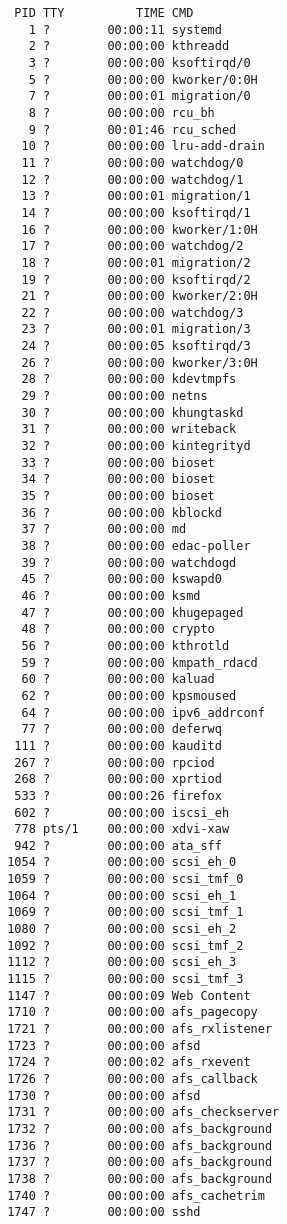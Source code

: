 \documentclass[a4paper]{article}
\begin{document}
\begin{figure}
\centering
\begin{verbatim}
  PID TTY          TIME CMD
    1 ?        00:00:11 systemd
    2 ?        00:00:00 kthreadd
    3 ?        00:00:00 ksoftirqd/0
    5 ?        00:00:00 kworker/0:0H
    7 ?        00:00:01 migration/0
    8 ?        00:00:00 rcu_bh
    9 ?        00:01:46 rcu_sched
   10 ?        00:00:00 lru-add-drain
   11 ?        00:00:00 watchdog/0
   12 ?        00:00:00 watchdog/1
   13 ?        00:00:01 migration/1
   14 ?        00:00:00 ksoftirqd/1
   16 ?        00:00:00 kworker/1:0H
   17 ?        00:00:00 watchdog/2
   18 ?        00:00:01 migration/2
   19 ?        00:00:00 ksoftirqd/2
   21 ?        00:00:00 kworker/2:0H
   22 ?        00:00:00 watchdog/3
   23 ?        00:00:01 migration/3
   24 ?        00:00:05 ksoftirqd/3
   26 ?        00:00:00 kworker/3:0H
   28 ?        00:00:00 kdevtmpfs
   29 ?        00:00:00 netns
   30 ?        00:00:00 khungtaskd
   31 ?        00:00:00 writeback
   32 ?        00:00:00 kintegrityd
   33 ?        00:00:00 bioset
   34 ?        00:00:00 bioset
   35 ?        00:00:00 bioset
   36 ?        00:00:00 kblockd
   37 ?        00:00:00 md
   38 ?        00:00:00 edac-poller
   39 ?        00:00:00 watchdogd
   45 ?        00:00:00 kswapd0
   46 ?        00:00:00 ksmd
   47 ?        00:00:00 khugepaged
   48 ?        00:00:00 crypto
   56 ?        00:00:00 kthrotld
   59 ?        00:00:00 kmpath_rdacd
   60 ?        00:00:00 kaluad
   62 ?        00:00:00 kpsmoused
   64 ?        00:00:00 ipv6_addrconf
   77 ?        00:00:00 deferwq
  111 ?        00:00:00 kauditd
  267 ?        00:00:00 rpciod
  268 ?        00:00:00 xprtiod
  533 ?        00:00:26 firefox
  602 ?        00:00:00 iscsi_eh
  778 pts/1    00:00:00 xdvi-xaw
  942 ?        00:00:00 ata_sff
 1054 ?        00:00:00 scsi_eh_0
 1059 ?        00:00:00 scsi_tmf_0
 1064 ?        00:00:00 scsi_eh_1
 1069 ?        00:00:00 scsi_tmf_1
 1080 ?        00:00:00 scsi_eh_2
 1092 ?        00:00:00 scsi_tmf_2
 1112 ?        00:00:00 scsi_eh_3
 1115 ?        00:00:00 scsi_tmf_3
 1147 ?        00:00:09 Web Content
 1710 ?        00:00:00 afs_pagecopy
 1721 ?        00:00:00 afs_rxlistener
 1723 ?        00:00:00 afsd
 1724 ?        00:00:02 afs_rxevent
 1726 ?        00:00:00 afs_callback
 1730 ?        00:00:00 afsd
 1731 ?        00:00:00 afs_checkserver
 1732 ?        00:00:00 afs_background
 1736 ?        00:00:00 afs_background
 1737 ?        00:00:00 afs_background
 1738 ?        00:00:00 afs_background
 1740 ?        00:00:00 afs_cachetrim
 1747 ?        00:00:00 sshd

\end{verbatim}
\end{figure}
\end{document}
